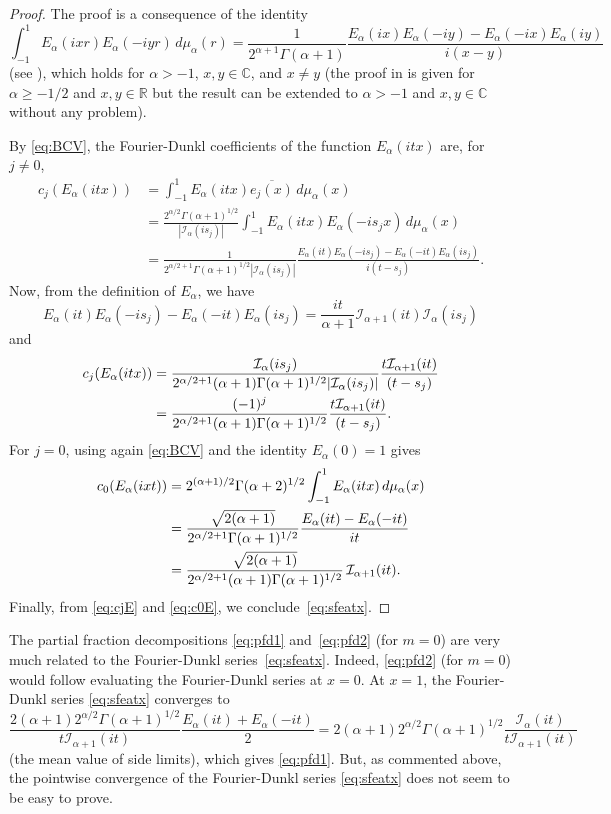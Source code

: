 \documentclass[10pt,a4paper]{article}
\theoremstyle{plain}
\theoremstyle{definition}
\numberwithin{equation}{section} %
\newcommand{\Ea}{E_{\alpha}}
\newcommand{\mua}{\mu_{\alpha}}
\newcommand{\I}{\mathcal{I}}
\newcommand{\RR}{\mathbb{R}}
\newcommand{\CC}{\mathbb{C}}
\begin{document}
\begin{proof}
The proof is a consequence of the identity
\begin{equation}
\label{eq:BCV}
  \int_{-1}^1 \Ea(ixr)\Ea(-iyr)\, d\mua(r)
  = \frac{1}{2^{\alpha+1}\Gamma(\alpha+1)}
    \frac{\Ea(ix)\Ea(-iy)-\Ea(-ix)\Ea(iy)}{i(x-y)}
\end{equation}
(see \cite[Lemma~1]{BCV}), which holds for $\alpha > -1$, $x,y\in \mathbb{C}$, and $x \ne  y$ (the proof in \cite{BCV} is given for $\alpha\ge -1/2$ and $x,y\in \RR$ but the result can be extended to $\alpha > -1$ and $x,y\in \CC$ without any problem).

By \eqref{eq:BCV}, the Fourier-Dunkl coefficients of the function $\Ea(itx)$ are,  for $j\ne0$,
\begin{align*}
  c_j(\Ea(itx)) &= \int_{-1}^1 \Ea(itx) \overline{e_j(x)}\,d\mua(x) \\
  &= \frac{2^{\alpha/2}\Gamma(\alpha+1)^{1/2}}{|\I_\alpha(is_j)|} \int_{-1}^1 \Ea(itx) \Ea(-is_j x)\, d\mua(x) \\
  &= \frac{1}{2^{\alpha/2+1}\Gamma(\alpha+1)^{1/2}|\I_\alpha(is_j)|}
  \frac{\Ea(it)\Ea(-is_j)-\Ea(-it)\Ea(is_j)}{i(t-s_j)}.
\end{align*}
Now, from the definition of $\Ea$, we have
\[
\Ea(it)\Ea(-is_j)-\Ea(-it)\Ea(is_j) = \frac{it}{\alpha+1}\I_{\alpha+1}(it)
\I_{\alpha}(is_j)
\]
and
\begin{align}
  c_j(\Ea(itx)) &= \frac{\I_\alpha(is_j)}{2^{\alpha/2+1}(\alpha+1)\Gamma(\alpha+1)^{1/2}|\I_\alpha(is_j)|}
  \frac{t\I_{\alpha+1}(it)}{(t-s_j)} \notag \\
  &= \frac{(-1)^j}{2^{\alpha/2+1}(\alpha+1)\Gamma(\alpha+1)^{1/2}}
  \frac{t\I_{\alpha+1}(it)}{(t-s_j)}.
\label{eq:cjE}
\end{align}
For $j=0$, using again \eqref{eq:BCV} and the identity $\Ea(0)=1$ gives
\begin{align}
  c_0(\Ea(ixt)) &= 2^{(\alpha+1)/2}\Gamma(\alpha+2)^{1/2}\int_{-1}^1 \Ea(itx)\,d\mua(x) \notag \\
  &= \frac{\sqrt{2(\alpha+1)}}{2^{\alpha/2+1}\Gamma(\alpha+1)^{1/2}}\frac{\Ea(it)-\Ea(-it)}{it} \notag \\
  &= \frac{\sqrt{2(\alpha+1)}}{2^{\alpha/2+1}(\alpha+1)\Gamma(\alpha+1)^{1/2}} \, \I_{\alpha+1}(it).
\label{eq:c0E}
\end{align}
Finally, from \eqref{eq:cjE} and \eqref{eq:c0E}, we conclude~\eqref{eq:sfeatx}.
\end{proof}

The partial fraction decompositions \eqref{eq:pfd1} and~\eqref{eq:pfd2} (for $m=0$) are very much related to the Fourier-Dunkl series~\eqref{eq:sfeatx}. Indeed, \eqref{eq:pfd2} (for $m=0$) would follow evaluating the Fourier-Dunkl series at $x=0$. At $x=1$, the Fourier-Dunkl series \eqref{eq:sfeatx} converges to
\[
  \frac{2(\alpha+1) 2^{\alpha/2}\Gamma(\alpha+1)^{1/2}}{t\I_{\alpha+1}(it)}
  \frac{\Ea(it)+\Ea(-it)}{2}
  = 2(\alpha+1)2^{\alpha/2}\Gamma(\alpha+1)^{1/2} \frac{\I_{\alpha}(it)}{t\I_{\alpha+1}(it)}
\]
(the mean value of side limits), which gives \eqref{eq:pfd1}. But, as commented above, the pointwise convergence of the Fourier-Dunkl series \eqref{eq:sfeatx} does not seem to be easy to prove.
\end{document}
